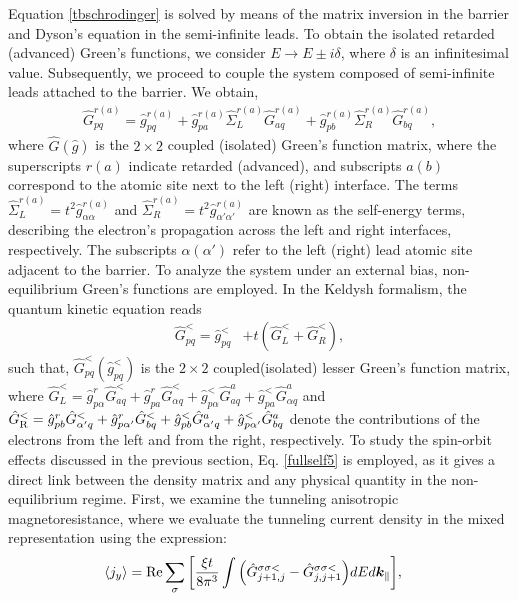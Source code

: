 \documentclass[10pt,pr,twocolumn,showpacs,amssymb,floatfix,superscriptaddress]{revtex4-1}
\newcommand{\tx}{\text}
\newcommand{\para}{\parallel}
\newcommand{\alp}{\alpha}
\newcommand{\sg}{\sigma}
\newcommand{\Sg}{\Sigma}
\newcommand{\h}{\hat}
\begin{document}
Equation \eqref{tbschrodinger} is solved by means of the matrix inversion in the barrier and Dyson's equation in the semi-infinite leads. To obtain the isolated retarded (advanced) Green's functions, we consider $E \rightarrow E \pm i\delta$, where $\delta$ is an infinitesimal value. Subsequently, we proceed to couple the system composed of semi-infinite leads attached to the barrier. We obtain,
\begin{align}
\h G_{pq}^{r(a)} = \h g_{pq}^{r(a)} + \h g_{pa}^{r(a)} \h \Sg_{L}^{r(a)} \h G_{aq}^{r(a)} + \h g_{pb}^{r(a)} \h \Sg_{R}^{r(a)} \h G_{bq}^{r(a)},
\label{eq:G}
\end{align}
where $\hat{G} (\hat{g})$ is the $2\times2$ coupled (isolated) Green's function matrix, where the superscripts $r(a)$ indicate retarded (advanced), and subscripts $a(b)$ correspond to the atomic site next to the left (right) interface. The terms $\hat{\Sigma}^{r(a)}_{L} = t^2 \hat{g}^{r(a)}_{\alpha\alpha}$ and $\hat{\Sigma}^{r(a)}_{R} = t^2 \hat{g}^{r(a)}_{\alpha'\alpha'}$ are known as the self-energy terms, describing the electron's propagation across the left and right interfaces, respectively. The subscripts $\alpha (\alpha')$ refer to the left (right) lead atomic site adjacent to the barrier. To analyze the system under an external bias, non-equilibrium Green's functions are employed. In the Keldysh formalism, the quantum kinetic equation reads
 \begin{align}
 \label{fullself5}
 \h G^<_{pq} = \h g^<_{pq} &+ t (\h G^<_{L } +  \h G^<_{R }),
 \end{align}
 such that, $\h G^<_{pq} (\h g^<_{pq})$ is the $2\times2$ coupled(isolated) lesser Green's function matrix, where $\h{G}^<_L = \h g^r_{p\alp}\h G^<_{aq} + \h g^r_{pa} \h G^<_{\alp q} +  \h g^<_{p\alp} \h{G}^a_{aq} + \h g^<_{pa}\h{G}^a_{\alp q}$  and $\h{G}^<_{\rm R}  = \h g^r_{pb}\h G^<_{\alp' q} + \h g^r_{p\alp'}\h G^<_{bq} +  \h g^<_{pb} \h{G}^a_{\alp' q} + \h g^<_{p\alp'}\h{G}^a_{bq}$ denote the contributions of the electrons from the left and from the right, respectively.  To study the spin-orbit effects discussed in the previous section, Eq. \eqref{fullself5} is employed, as it gives a direct link between the density matrix and any physical quantity in the non-equilibrium regime. First, we examine the tunneling anisotropic magnetoresistance, where we evaluate the tunneling current density in the mixed representation using the expression: 
\begin{align}
\langle j_y \rangle &=  \tx{Re} \sum_\sg  \bigg{[} \frac{\xi t}{8\pi^3} \int \Big{(}   \h G_{j+1,j}^{\sg\sg <}  - \h G_{j,j+1}^{\sg\sg <} \Big{)} dE d\bm k _\para \bigg{]}, 
\label{qchargeoky}
\end{align}
\end{document}
